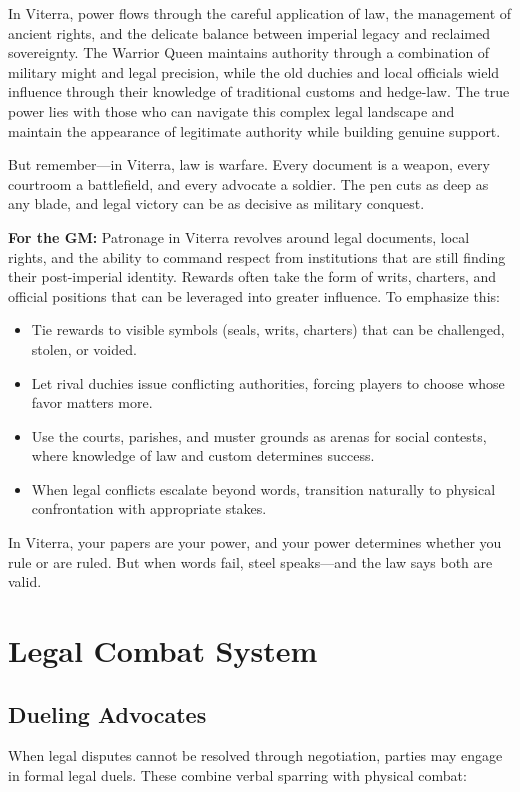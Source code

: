 \begin{tcolorbox}[colback=black!3,colframe=black!40!white,title={Patronage \& Power}]
In Viterra, power flows through the careful application of law, the management of ancient rights, and the delicate balance between imperial legacy and reclaimed sovereignty. The Warrior Queen maintains authority through a combination of military might and legal precision, while the old duchies and local officials wield influence through their knowledge of traditional customs and hedge-law. The true power lies with those who can navigate this complex legal landscape and maintain the appearance of legitimate authority while building genuine support.

But remember—in Viterra, law is warfare. Every document is a weapon, every courtroom a battlefield, and every advocate a soldier. The pen cuts as deep as any blade, and legal victory can be as decisive as military conquest.

\textbf{For the GM:}  
Patronage in Viterra revolves around legal documents, local rights, and the ability to command respect from institutions that are still finding their post-imperial identity. Rewards often take the form of writs, charters, and official positions that can be leveraged into greater influence. To emphasize this:
\begin{itemize}
\item Tie rewards to visible symbols (seals, writs, charters) that can be challenged, stolen, or voided.
\item Let rival duchies issue conflicting authorities, forcing players to choose whose favor matters more.
\item Use the courts, parishes, and muster grounds as arenas for social contests, where knowledge of law and custom determines success.
\item When legal conflicts escalate beyond words, transition naturally to physical confrontation with appropriate stakes.
\end{itemize}
In Viterra, your papers are your power, and your power determines whether you rule or are ruled. But when words fail, steel speaks—and the law says both are valid.
\end{tcolorbox}

\section*{Legal Combat System}

\subsection*{Dueling Advocates}
When legal disputes cannot be resolved through negotiation, parties may engage in formal legal duels. These combine verbal sparring with physical combat:

